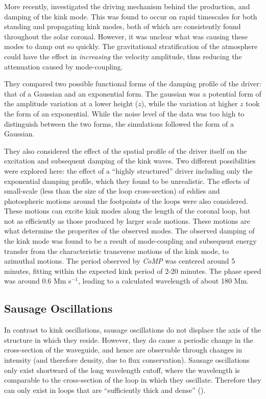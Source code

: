 \documentclass[preprint2]{aastex}
\begin{document}
More recently, \cite{kink_2} investigated the driving mechanism
behind the production, and damping of the kink mode.
This was found to occur on rapid timescales for both standing
and propagating kink modes, both of which are consistently found
throughout the solar coronal.
However, it was unclear what was causing
these modes to damp out so quickly.
The gravitational stratification of the atmosphere could have
the effect in \emph{increasing} the velocity amplitude, thus
reducing the attenuation caused by mode-coupling.

They compared two possible functional forms of the damping profile
of the driver: that of a Gaussian and an exponential form.
The gaussian was a potential form of the amplitude variation at a
lower height ($z$), while the variation at higher $z$ took the
form of an exponential.
While the noise level of the data was too high to distinguish
between the two forms, the simulations followed the form of a
Gaussian.

They also considered the effect of the spatial profile of the driver
itself on the excitation and subsequent damping of the kink
waves. Two different possibilities were explored here:
the effect of a ``highly structured'' driver including only the
exponential damping profile, which they
found to be unrealistic.
The effects of small-scale (less than the size of the loop cross-section)
of eddies and photospheric motions around the footpoints of the loops
were also considered.
These motions can excite kink modes along the length of the coronal
loop, but not as efficiently as those produced by larger scale
motions. These motions are what determine the properites of the
observed modes.
The observed damping of the kink mode was found to be a result
of mode-coupling and subsequent energy transfer from the characteristic
transverse motions of the kink mode, to azimuthal motions.
The period observed by \emph{CoMP} was centered around
5 minutes, fitting within the expected kink period of 2-20 minutes.
The phase speed was around 0.6 Mm s$^{-1}$, leading to a calculated
wavelength of about 180 Mm.

\subsection{Sausage Oscillations}\label{sausage}
In contrast to kink oscillations, sausage oscillations do not displace
the axis of the structure in which they reside. However, they do cause
a periodic change in the cross-section of the waveguide, and hence
are observable through changes in intensity (and therefore density,
due to flux conservation). Sausage oscillations only exist shortward
of the long wavelength cutoff, where the wavelength is comparable to
the cross-section of the loop in which they oscillate. Therefore
they can only exist in loops that are ``sufficiently thick and dense''
(\cite{pfw_2}).
\end{document}
